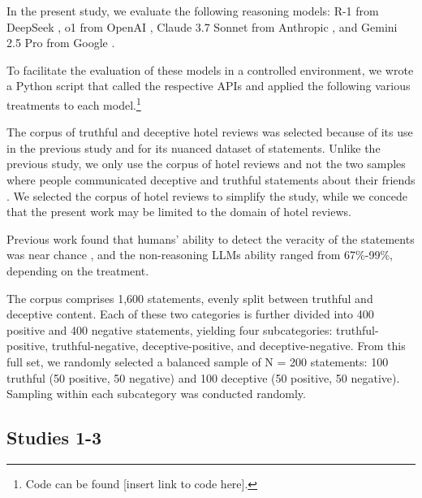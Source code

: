 \documentclass{article}
\begin{document}
In the present study, we evaluate the following reasoning models: R-1 from DeepSeek \citep{deepseek-ai_deepseek-r1_2025}, o1 from OpenAI \citep{openai_openai_2024}, Claude 3.7 Sonnet from Anthropic \citep{anthropic_claude_2025}, and Gemini 2.5 Pro from Google \citep{deepmindGemini}.

To facilitate the evaluation of these models in a controlled environment, we wrote a Python script that called the respective APIs and applied the following various treatments to each model.\footnote{Code can be found [insert link to code here].} %

The corpus of truthful and deceptive hotel reviews \citep{ott_finding_2011} was selected because of its use in the previous study \citep{markowitz_generative_2024} and for its nuanced dataset of statements. Unlike the previous study, we only use the corpus of hotel reviews \citep{ott_finding_2011} and not the two samples where people communicated deceptive and truthful statements about their friends \citep{markowitz_when_2020, lloyd_miami_2019}. We selected the corpus of hotel reviews to simplify the study, while we concede that the present work may be limited to the domain of hotel reviews.

Previous work \citep{markowitz_generative_2024} found that humans' ability to detect the veracity of the statements was near chance \citep{markowitz_generative_2024}, and the non-reasoning LLMs ability ranged from 67\%-99\%, depending on the treatment.

The corpus comprises 1,600 statements, evenly split between truthful and deceptive content. Each of these two categories is further divided into 400 positive and 400 negative statements, yielding four subcategories: truthful-positive, truthful-negative, deceptive-positive, and deceptive-negative. From this full set, we randomly selected a balanced sample of N = 200 statements: 100 truthful (50 positive, 50 negative) and 100 deceptive (50 positive, 50 negative). Sampling within each subcategory was conducted randomly.


\subsection{Studies 1-3}
\end{document}
